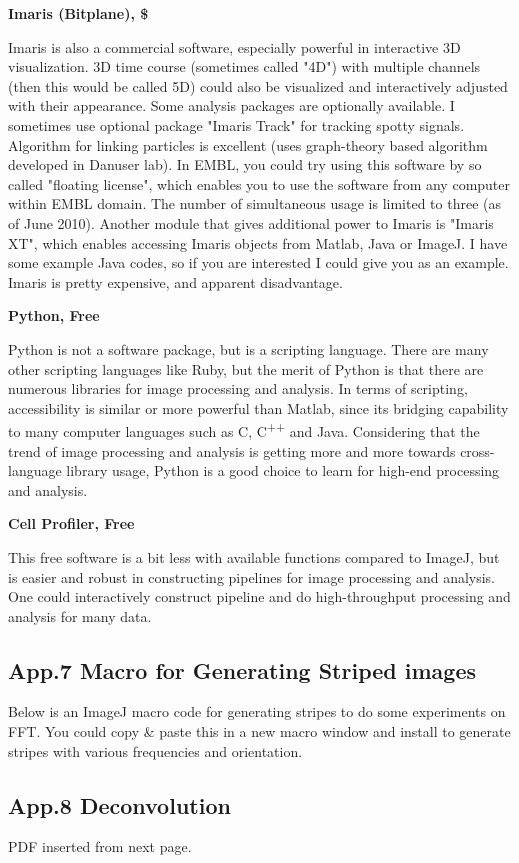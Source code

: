 \textbf{Imaris (Bitplane), \$}



Imaris is also a commercial software, especially powerful in interactive
3D visualization. 3D time course (sometimes called
"4D") with multiple channels (then
this would be called 5D) could also be visualized and interactively
adjusted with their appearance. Some analysis packages are optionally
available. I sometimes use optional package "Imaris
Track" for tracking spotty signals. Algorithm for
linking particles is excellent (uses graph-theory based algorithm
developed in Danuser lab). In EMBL, you could try using this software
by so called "floating license",
which enables you to use the software from any computer within EMBL
domain. The number of simultaneous usage is limited to three (as of
June 2010). Another module that gives additional power to Imaris is
"Imaris XT", which enables
accessing Imaris objects from Matlab, Java or ImageJ. I have some
example Java codes, so if you are interested I could give you as an
example. Imaris is pretty expensive, and apparent disadvantage. 



\textbf{Python, Free}

Python is not a software package, but is a scripting language. There are
many other scripting languages like Ruby, but the merit of Python is
that there are numerous libraries for image processing and analysis. In
terms of scripting, accessibility is similar or more powerful than
Matlab, since its bridging capability to many computer languages such
as C, C\textsuperscript{++} and Java. Considering that the trend of
image processing and analysis is getting more and more towards
cross-language library usage, Python is a good choice to learn for
high-end processing and analysis.

\textbf{Cell Profiler, Free}

This free software is a bit less with available functions compared to
ImageJ, but is easier and robust in constructing pipelines for image
processing and analysis. One could interactively construct pipeline and
do high-throughput processing and analysis for many data. 



\clearpage
\subsection{App.7 Macro for Generating Striped images}
\label{app7}

Below is an ImageJ macro code for generating stripes to do some
experiments on FFT. You could copy \& paste this in a new macro window
and install to generate stripes with various frequencies and orientation.  


\clearpage

\subsection{App.8 Deconvolution}
\label{app4}

PDF inserted from next page. 



\clearpage
